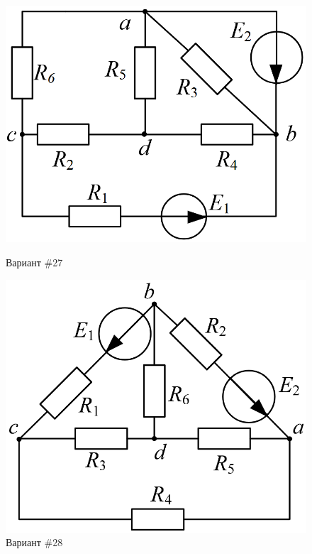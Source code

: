 \begin{figure}[H]
    \centering
    \begin{minipage}{0.48\textwidth}
        \centering
        \includegraphics[width=\textwidth]{images/27_task.png}
        \caption{Вариант \#27}
        \label{fig:task_27}
    \end{minipage}
    \hfill
    \begin{minipage}{0.48\textwidth}
        \centering
        \includegraphics[width=\textwidth]{images/28_task.png}
        \caption{Вариант \#28}
        \label{fig:task_28}
    \end{minipage}
\end{figure}


